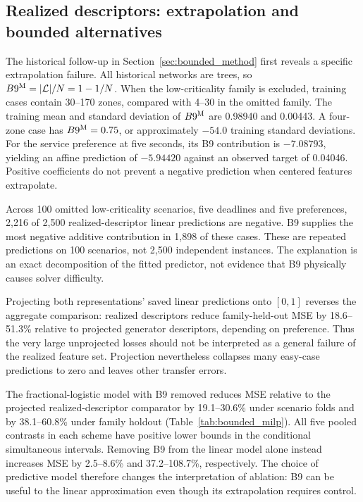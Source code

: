 \subsection{Realized descriptors: extrapolation and bounded alternatives}
\label{sec:bounded_results}
The historical follow-up in Section~\ref{sec:bounded_method} first reveals a
specific extrapolation failure. All historical networks are trees, so
$B9^{\rm M}=|\mathcal L|/N=1-1/N$. When the low-criticality family is excluded,
training cases contain 30--170 zones, compared with 4--30 in the omitted
family. The training mean and standard deviation of $B9^{\rm M}$ are
0.98940 and 0.00443. A four-zone case has $B9^{\rm M}=0.75$, or approximately
$-54.0$ training standard deviations. For the service preference at five
seconds, its B9 contribution is $-7.08793$, yielding an affine prediction
of $-5.94420$ against an observed target of 0.04046. Positive coefficients
do not prevent a negative prediction when centered features extrapolate.

Across 100 omitted low-criticality scenarios, five deadlines and five
preferences, 2,216 of 2,500 realized-descriptor linear predictions are
negative. B9 supplies the most negative additive contribution in 1,898 of
these cases. These are repeated predictions on 100 scenarios, not 2,500
independent instances. The explanation is an exact decomposition of the
fitted predictor, not evidence that B9 physically causes solver difficulty.

Projecting both representations' saved linear predictions onto $[0,1]$
reverses the aggregate comparison: realized descriptors reduce family-held-out
MSE by 18.6--51.3\% relative to projected generator descriptors, depending on
preference. Thus the very large unprojected losses should not be interpreted
as a general failure of the realized feature set. Projection nevertheless
collapses many easy-case predictions to zero and leaves other transfer errors.



The fractional-logistic model with B9 removed reduces MSE relative to the
projected realized-descriptor comparator by 19.1--30.6\% under scenario folds
and by 38.1--60.8\% under family holdout (Table~\ref{tab:bounded_milp}). All
five pooled contrasts in each scheme have positive lower bounds in the
conditional simultaneous intervals. Removing B9 from the linear model alone
instead increases MSE by 2.5--8.6\% and 37.2--108.7\%, respectively. The
choice of predictive model therefore changes the interpretation of ablation:
B9 can be useful to the linear approximation even though its extrapolation
requires control.

